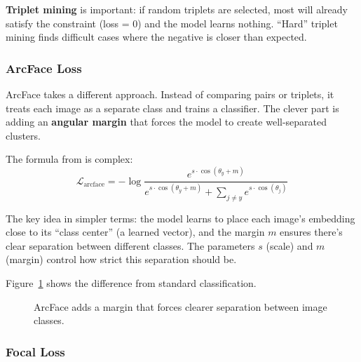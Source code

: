 \documentclass[
    english,
]{VUMIFPSbakalaurinis}
\begin{document}
\textbf{Triplet mining} is important: if random triplets are selected, most will already satisfy the constraint (loss = 0) and the model learns nothing. \enquote{Hard} triplet mining finds difficult cases where the negative is closer than expected.

\subsubsection{ArcFace Loss}

ArcFace \cite{Den22} takes a different approach. Instead of comparing pairs or triplets, it treats each image as a separate class and trains a classifier. The clever part is adding an \textbf{angular margin} that forces the model to create well-separated clusters.

The formula from \cite{Den22} is complex:
\begin{equation}
\mathcal{L}_{\text{arcface}} = -\log \frac{e^{s \cdot \cos(\theta_{y} + m)}}{e^{s \cdot \cos(\theta_{y} + m)} + \sum_{j \neq y} e^{s \cdot \cos(\theta_j)}}
\label{eq:arcface}
\end{equation}

The key idea in simpler terms: the model learns to place each image's embedding close to its \enquote{class center} (a learned vector), and the margin $m$ ensures there's clear separation between different classes. The parameters $s$ (scale) and $m$ (margin) control how strict this separation should be.

Figure~\ref{fig:arcface} shows the difference from standard classification.

\begin{figure}[H]
\centering
{}
\caption{ArcFace adds a margin that forces clearer separation between image classes.}
\label{fig:arcface}
\end{figure}

\subsubsection{Focal Loss}
\end{document}
